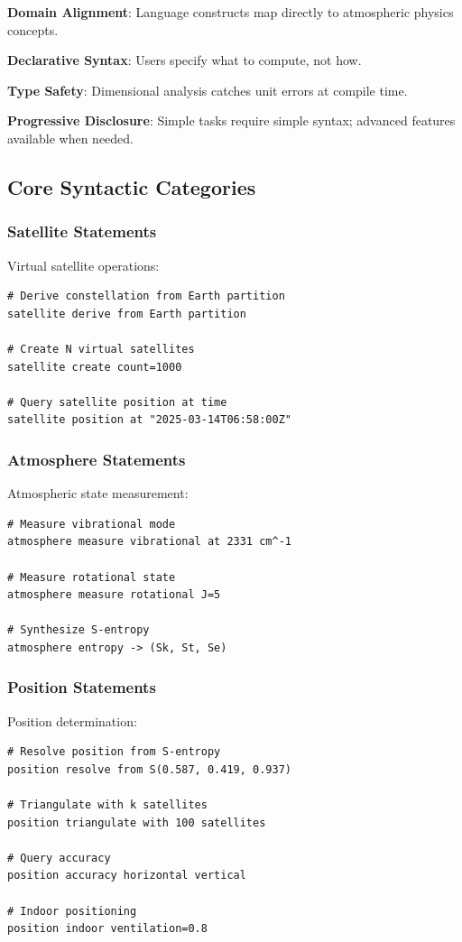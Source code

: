 \documentclass[twocolumn,10pt,a4paper]{article}
\theoremstyle{definition}
\theoremstyle{remark}
\begin{document}
\textbf{Domain Alignment}: Language constructs map directly to atmospheric physics concepts.

\textbf{Declarative Syntax}: Users specify what to compute, not how.

\textbf{Type Safety}: Dimensional analysis catches unit errors at compile time.

\textbf{Progressive Disclosure}: Simple tasks require simple syntax; advanced features available when needed.

\subsection{Core Syntactic Categories}

\subsubsection{Satellite Statements}

Virtual satellite operations:
\begin{lstlisting}
# Derive constellation from Earth partition
satellite derive from Earth partition

# Create N virtual satellites
satellite create count=1000

# Query satellite position at time
satellite position at "2025-03-14T06:58:00Z"
\end{lstlisting}

\subsubsection{Atmosphere Statements}

Atmospheric state measurement:
\begin{lstlisting}
# Measure vibrational mode
atmosphere measure vibrational at 2331 cm^-1

# Measure rotational state
atmosphere measure rotational J=5

# Synthesize S-entropy
atmosphere entropy -> (Sk, St, Se)
\end{lstlisting}

\subsubsection{Position Statements}

Position determination:
\begin{lstlisting}
# Resolve position from S-entropy
position resolve from S(0.587, 0.419, 0.937)

# Triangulate with k satellites
position triangulate with 100 satellites

# Query accuracy
position accuracy horizontal vertical

# Indoor positioning
position indoor ventilation=0.8
\end{lstlisting}
\end{document}
